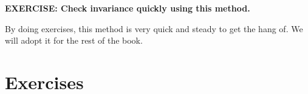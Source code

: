 	\textbf{EXERCISE: Check invariance quickly using this method.}

	By doing exercises, this method is very quick and steady to get the hang of. We will adopt it for the rest of the book.
	
	
	\section{Exercises} %
	\label{sec:exercises1}
	

% 